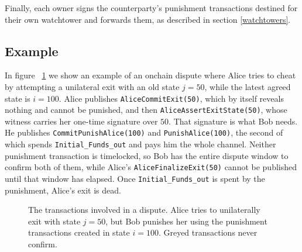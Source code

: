 \documentclass[11pt,a4paper]{article}
\newcommand{\hopl}{arc (0:180:0.1)}
\newcommand{\txname}[1]{\texttt{#1}}
\newcommand{\ioname}[1]{\texttt{#1}}
\begin{document}
Finally, each owner signs the counterparty's punishment transactions destined for their own watchtower and forwards them, as described in section \ref{watchtowers}.

\subsection{Example}

In figure ~\ref{fig:OTS-PC-EXAMPLE} we show an example of an onchain dispute where Alice tries to cheat by attempting a unilateral exit with an old state $j=50$, while the latest agreed state is $i=100$. Alice publishes \txname{AliceCommitExit(50)}, which by itself reveals nothing and cannot be punished, and then \txname{AliceAssertExitState(50)}, whose witness carries her one-time signature over $50$. That signature is what Bob needs. He publishes \txname{CommitPunishAlice(100)} and \txname{PunishAlice(100)}, the second of which spends \ioname{Initial\_Funds\_out} and pays him the whole channel. Neither punishment transaction is timelocked, so Bob has the entire dispute window to confirm both of them, while Alice's \txname{AliceFinalizeExit(50)} cannot be published until that window has elapsed. Once \ioname{Initial\_Funds\_out} is spent by the punishment, Alice's exit is dead.

\begin{figure}[h]
\centering
{}
\caption{The transactions involved in a dispute. Alice tries to unilaterally exit with state $j=50$, but Bob punishes her using the punishment transactions created in state $i=100$. Greyed transactions never confirm.}
\label{fig:OTS-PC-EXAMPLE}
\end{figure}
\end{document}
